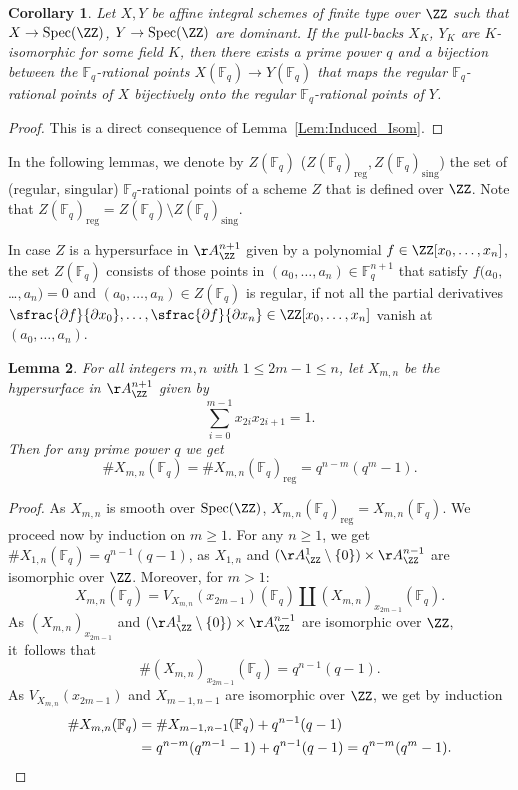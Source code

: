 \documentclass[JEP,XML,SOM,Unicode,NoFloatCountersInSection,published]{cedram}
\newtheorem{lemma}{Lemma}[section]
\newtheorem{corollary}[lemma]{Corollary}
\theoremstyle{definition}
\newcommand\FF{{\mathbb F}}
\DeclareMathOperator{\sing}{sing}
\DeclareMathOperator{\reg}{reg}
\DeclareMathOperator{\Spec}{Spec}
\begin{document}
\begin{corollary}
\label{Cor:Same_number_of_points}
Let $X, Y$ be affine integral schemes of finite type over $\ZZ$
such that $X \to \Spec(\ZZ)$, $Y \to \Spec(\ZZ)$ are dominant.
If the pull-backs $X_K$, $Y_K$ are $K$-isomorphic for some field $K$, then
there exists a prime power $q$ and a bijection
between the $\FF_{q}$-rational points $X(\FF_{q}) \to Y(\FF_{q})$
that maps the regular $\FF_{q}$-rational points of $X$ bijectively
onto the regular $\FF_{q}$-rational points of $Y$.
\end{corollary}

\begin{proof}
This is a direct consequence of Lemma~\ref{Lem:Induced_Isom}.
\end{proof}

In the following lemmas, we denote by $Z(\FF_q)$ ($Z(\FF_q)_{\reg}, Z(\FF_q)_{\sing}$) the set of (regular, singular)
$\FF_q$-rational points of a scheme $Z$ that is defined over $\ZZ$. Note that $Z(\FF_q)_{\reg} = Z(\FF_q) \setminus Z(\FF_q)_{\sing}$.

In case $Z$ is a hypersurface in $\AA^{n+1}_{\ZZ}$ given by a polynomial $f \in \ZZ[x_0, \ldots, x_n]$,
the set $Z(\FF_q)$ consists of those points in $(a_0, \ldots, a_n) \in \FF_q^{n+1}$ that satisfy
$f(a_0, $\ldots$, a_n) = 0$ and $(a_0, \ldots, a_n) \in Z(\FF_q)$ is regular, if not all the partial derivatives
$\sfrac{\partial f}{\partial x_0}, \ldots, \sfrac{\partial f}{\partial x_n} \in \ZZ[x_0, \ldots, x_{n}]$ vanish at $(a_0, \ldots, a_n)$.

\begin{lemma}
\label{Lem:Number_of_F_q-points_1}
For all integers $m,n$ with $1\le 2m-1\le n$, let $X_{m, n}$ be the hypersurface in $\AA^{n+1}_{\ZZ}$ given by
\[
\sum_{i=0}^{m-1} x_{2i} x_{2i+1} = 1.
\]
Then for any prime power $q$ we get
\[
\# X_{m, n}(\FF_q) = \# X_{m, n}(\FF_q)_{\reg} = q^{n-m}(q^m-1).
\] \end{lemma}\begin{proof}
As $X_{m,n}$ is smooth over $\Spec(\ZZ)$, $X_{m, n}(\FF_q)_{\reg} = X_{m, n}(\FF_q)$.
We proceed now by induction on $m \geq 1$. For any $n \geq 1$, we get
$\# X_{1, n}(\FF_q) = q^{n-1} (q-1)$, as $X_{1, n}$ and $(\AA_{\ZZ}^1 \setminus \{0\}) \times \AA_{\ZZ}^{n-1}$
are isomorphic over $\ZZ$. Moreover, for $m > 1$:
\[
X_{m, n}(\FF_q) = V_{X_{m, n}}(x_{2m-1})(\FF_q) \coprod (X_{m, n})_{x_{2m-1}}(\FF_q).
\]
As $(X_{m, n})_{x_{2m-1}}$ and $(\AA_{\ZZ}^1 \setminus \{0\}) \times \AA_{\ZZ}^{n-1}$ are isomorphic over $\ZZ$,
it~follows that \[\# (X_{m, n})_{x_{2m-1}}(\FF_q) = q^{n-1}(q-1).\] As $V_{X_{m, n}}(x_{2m-1})$ and
$X_{m-1, n-1}$ are isomorphic over $\ZZ$, we get by induction
\begin{align*}
\# X_{m, n}(\FF_q) &= \# X_{m-1, n-1}(\FF_q) + q^{n-1}(q-1) \\
&= q^{n-m}(q^{m-1}-1) + q^{n-1}(q-1) = q^{n-m}(q^m-1).\qedhere
\end{align*}
\end{proof}
\end{document}
